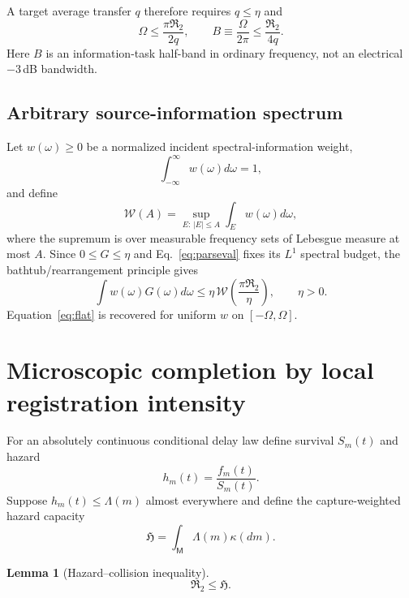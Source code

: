 \documentclass[aps,prapplied,preprint,nofootinbib]{revtex4-2}
\newtheorem{lemma}{Lemma}
\newcommand{\Wcal}{\mathcal W}
\newcommand{\Rtwo}{\mathfrak R_2}
\newcommand{\Hcap}{\mathfrak H}
\newcommand{\M}{\mathsf M}
\begin{document}
A target average transfer $q$ therefore requires $q\le\eta$ and
\begin{equation}
\Omega\le\frac{\pi\Rtwo}{2q},
\qquad
B\equiv\frac{\Omega}{2\pi}\le\frac{\Rtwo}{4q}.
\end{equation}
Here $B$ is an information-task half-band in ordinary frequency, not an electrical $-3\,$dB bandwidth.

\subsection{Arbitrary source-information spectrum}

Let $w(\omega)\ge0$ be a normalized incident spectral-information weight,
\begin{equation}
\int_{-\infty}^{\infty}w(\omega)d\omega=1,
\end{equation}
and define
\begin{equation}
\Wcal(A)=\sup_{E:\,|E|\le A}\int_Ew(\omega)d\omega,
\label{eq:W}
\end{equation}
where the supremum is over measurable frequency sets of Lebesgue measure at most $A$. Since $0\le G\le\eta$ and Eq.~\eqref{eq:parseval} fixes its $L^1$ spectral budget, the bathtub/rearrangement principle gives
\begin{equation}
\boxed{
\int w(\omega)G(\omega)d\omega
\le\eta\,\Wcal\!\left(\frac{\pi\Rtwo}{\eta}\right),\qquad \eta>0.}
\label{eq:arbsource}
\end{equation}
Equation~\eqref{eq:flat} is recovered for uniform $w$ on $[-\Omega,\Omega]$.

\section{Microscopic completion by local registration intensity}

For an absolutely continuous conditional delay law define survival $S_m(t)$ and hazard
\begin{equation}
h_m(t)=\frac{f_m(t)}{S_m(t)}.
\end{equation}
Suppose $h_m(t)\le\Lambda(m)$ almost everywhere and define the capture-weighted hazard capacity
\begin{equation}
\boxed{\Hcap=\int_{\M}\Lambda(m)\kappa(dm).}
\label{eq:Hcap}
\end{equation}

\begin{lemma}[Hazard--collision inequality]
\begin{equation}
\boxed{\Rtwo\le\Hcap.}
\label{eq:R2H}
\end{equation}
\end{lemma}
\end{document}
